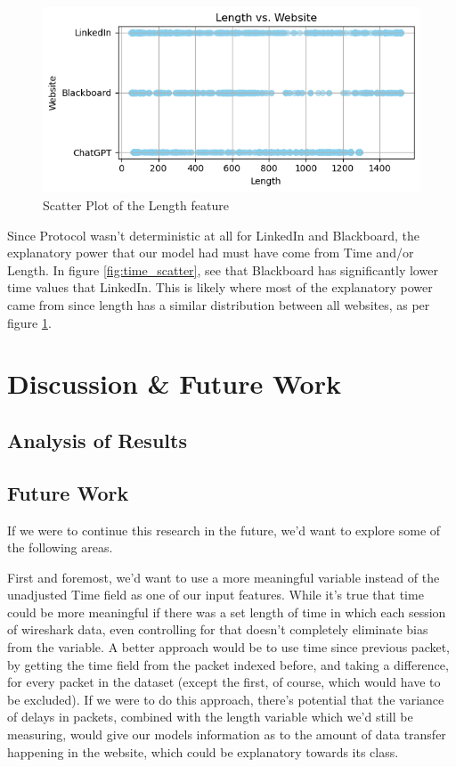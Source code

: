 \documentclass[10pt,sigconf,letterpaper,nonacm]{acmart}
\begin{document}
\begin{figure}
    \centering
    \includegraphics[width=1\linewidth]{Figures_and_Graphs/length_scatter.png}
    \caption{Scatter Plot of the Length feature}
    \label{fig:length_scatter}
\end{figure}

Since Protocol wasn't deterministic at all for LinkedIn and Blackboard, the explanatory power that our model had must have come from Time and/or Length. In figure \ref{fig:time_scatter}, see that Blackboard has significantly lower time values that LinkedIn. 
This is likely where most of the explanatory power came from since length has a similar distribution between all websites, as per figure \ref{fig:length_scatter}.

\section{Discussion \& Future Work}
\subsection{Analysis of Results}
\subsection{Future Work}

If we were to continue this research in the future, we'd want to explore some of the following areas.

First and foremost, we'd want to use a more meaningful variable instead of the unadjusted Time field as one of our input features. While it's true that time could be more meaningful if there was a set length of time in which each session of wireshark data, even controlling for that doesn't completely eliminate bias from the variable. A better approach would be to use time since previous packet, by getting the time field from the packet indexed before, and taking a difference, for every packet in the dataset (except the first, of course, which would have to be excluded). If we were to do this approach, there's potential that the variance of delays in packets, combined with the length variable which we'd still be measuring, would give our models information as to the amount of data transfer happening in the website, which could be explanatory towards its class.
\end{document}
